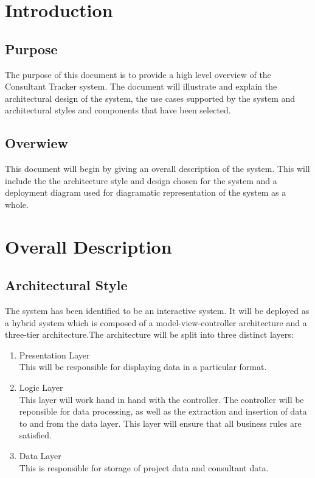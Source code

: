 \documentclass[a4paper, 12pt, oneside]{article}
\begin{document}
\newpage
\tableofcontents
\newpage



\section{Introduction}

\subsection{Purpose}
	The purpose of this document is to provide a high level overview of the Consultant Tracker system. The document will illustrate and explain the architectural design of the system, the use cases supported by the system and architectural styles and components that have been selected. 

\subsection{Overwiew}
	This document will begin by giving an overall description of the system. This will include the the architecture style and design chosen for the system and a deployment diagram used for diagramatic representation of the system as a whole.
\newpage
\section{Overall Description}

\subsection{Architectural Style}
	The system has been identified to be an interactive system. It will be deployed as a hybrid system which is composed of a model-view-controller architecture and a three-tier architecture.The architecture will be split into three distinct layers:
\begin{enumerate}
	\item Presentation Layer
		\\This will be responsible for displaying data in a particular format.
	\item Logic Layer
		\\ This layer will work hand in hand with the controller. The controller will be reponsible for data processing, as well as the extraction and insertion of data to and from the data layer. This layer will ensure that all business rules are satisfied.
	\item Data Layer
		\\This is responsible for storage of project data and consultant data.
\end{enumerate}
\end{document}
